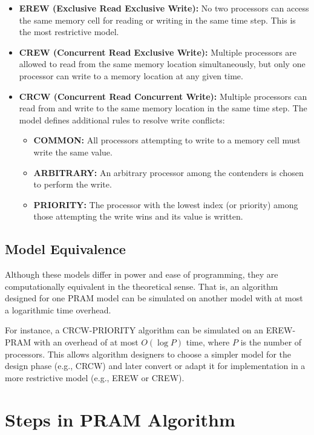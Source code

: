 \documentclass[12pt]{book}
\begin{document}
\begin{itemize}
    \item \textbf{EREW (Exclusive Read Exclusive Write):} No two processors can access the same memory cell for reading or writing in the same time step. This is the most restrictive model.
    
    \item \textbf{CREW (Concurrent Read Exclusive Write):} Multiple processors are allowed to read from the same memory location simultaneously, but only one processor can write to a memory location at any given time.
    
    \item \textbf{CRCW (Concurrent Read Concurrent Write):} Multiple processors can read from and write to the same memory location in the same time step. The model defines additional rules to resolve write conflicts:
    \begin{itemize}
        \item \textbf{COMMON:} All processors attempting to write to a memory cell must write the same value.
        \item \textbf{ARBITRARY:} An arbitrary processor among the contenders is chosen to perform the write.
        \item \textbf{PRIORITY:} The processor with the lowest index (or priority) among those attempting the write wins and its value is written.
    \end{itemize}
\end{itemize}

\subsection{Model Equivalence}
Although these models differ in power and ease of programming, they are computationally equivalent in the theoretical sense. That is, an algorithm designed for one PRAM model can be simulated on another model with at most a logarithmic time overhead.

For instance, a CRCW-PRIORITY algorithm can be simulated on an EREW-PRAM with an overhead of at most $O(\log P)$ time, where $P$ is the number of processors. This allows algorithm designers to choose a simpler model for the design phase (e.g., CRCW) and later convert or adapt it for implementation in a more restrictive model (e.g., EREW or CREW).

\section{Steps in PRAM Algorithm}
\end{document}
